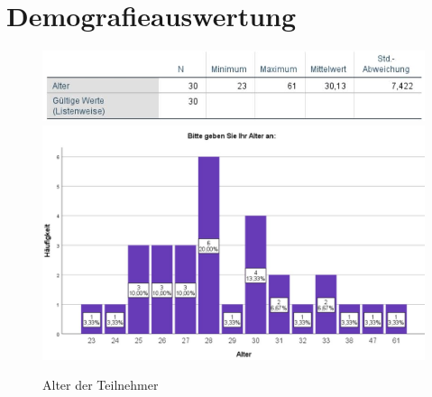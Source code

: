 \documentclass[a4paper,11pt]{article}%
\renewcommand{\\}{\vspace*{0.5\baselineskip} \newline}
\begin{document}
\clearpage
\newpage
	\section{Demografieauswertung}
	\begin{figure}[H]
	\centering
		\begin{footnotesize}
			\includegraphics[scale=0.6]{Abbildungen/Pre_QuestionnaireStatistiks/teilnehmerStatistik}\\
			\includegraphics[scale=0.5]{Abbildungen/Demographie/alter}\\
			\caption{Alter der Teilnehmer}
			\label{fig:Teilnehmer}
		\end{footnotesize}
	\end{figure}	
	
\end{document}
